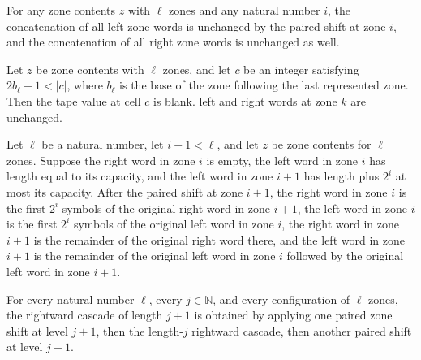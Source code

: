 \begin{theorem}
\label{Turing.zoneStepPair_side}
\leanok
{}
For any zone contents $z$ with $\ell$ zones and any natural number $i$, the concatenation
of all left zone words is unchanged by the paired shift at zone $i$, and the
concatenation of all right zone words is unchanged as well.
\end{theorem}

\begin{theorem}
\label{Turing.zoneStepPair_frame}
\leanok
{}
Let $z$ be zone contents with $\ell$ zones, and let $c$ be an integer satisfying
$2b_\ell+1<|c|$, where $b_\ell$ is the base of the zone following the last represented zone. Then the tape value at cell $c$ is blank.
left and right words at zone $k$ are unchanged.
\end{theorem}

\begin{theorem}
\label{Turing.zoneStepPair_active}
\leanok
{}
Let $\ell$ be a natural number, let $i+1<\ell$, and let $z$ be zone contents for $\ell$
zones. Suppose the right word in zone $i$ is empty, the left word in zone $i$ has length
equal to its capacity, and the left word in zone $i+1$ has length plus $2^i$ at most its
capacity. After the paired shift at zone $i+1$, the right word in zone $i$ is the first
$2^i$ symbols of the original right word in zone $i+1$, the left word in zone $i$ is the
first $2^i$ symbols of the original left word in zone $i$, the right word in zone $i+1$
is the remainder of the original right word there, and the left word in zone $i+1$ is
the remainder of the original left word in zone $i$ followed by the original left word
in zone $i+1$.
\end{theorem}

\begin{theorem}
\label{Turing.zoneCascadeRight_succ}
\leanok
{}
For every natural number $\ell$, every $j\in\mathbb{N}$, and every configuration of
$\ell$ zones, the rightward cascade of length $j+1$ is obtained by applying one paired
zone shift at level $j+1$, then the length-$j$ rightward cascade, then another paired
shift at level $j+1$.
\end{theorem}


